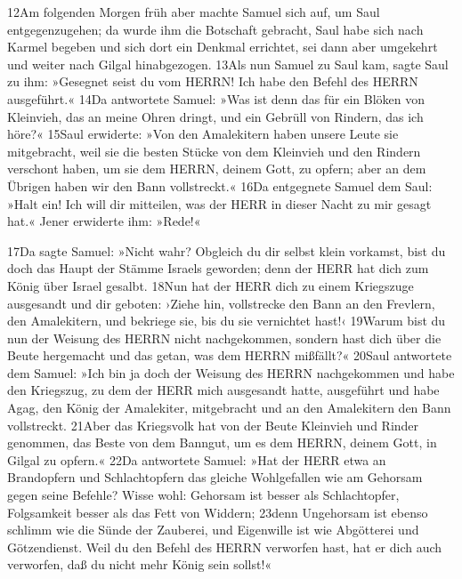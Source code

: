 12Am folgenden Morgen früh aber machte Samuel sich auf, um Saul
entgegenzugehen; da wurde ihm die Botschaft gebracht, Saul habe sich
nach Karmel begeben und sich dort ein Denkmal errichtet, sei dann aber
umgekehrt und weiter nach Gilgal hinabgezogen. 13Als nun Samuel zu Saul
kam, sagte Saul zu ihm: »Gesegnet seist du vom HERRN! Ich habe den
Befehl des HERRN ausgeführt.« 14Da antwortete Samuel: »Was ist denn das
für ein Blöken von Kleinvieh, das an meine Ohren dringt, und ein Gebrüll
von Rindern, das ich höre?« 15Saul erwiderte: »Von den Amalekitern haben
unsere Leute sie mitgebracht, weil sie die besten Stücke von dem
Kleinvieh und den Rindern verschont haben, um sie dem HERRN, deinem
Gott, zu opfern; aber an dem Übrigen haben wir den Bann vollstreckt.«
16Da entgegnete Samuel dem Saul: »Halt ein! Ich will dir mitteilen, was
der HERR in dieser Nacht zu mir gesagt hat.« Jener erwiderte ihm:
»Rede!«

17Da sagte Samuel: »Nicht wahr? Obgleich du dir selbst klein vorkamst,
bist du doch das Haupt der Stämme Israels geworden; denn der HERR hat
dich zum König über Israel gesalbt. 18Nun hat der HERR dich zu einem
Kriegszuge ausgesandt und dir geboten: ›Ziehe hin, vollstrecke den Bann
an den Frevlern, den Amalekitern, und bekriege sie, bis du sie
vernichtet hast!‹ 19Warum bist du nun der Weisung des HERRN nicht
nachgekommen, sondern hast dich über die Beute hergemacht und das getan,
was dem HERRN mißfällt?« 20Saul antwortete dem Samuel: »Ich bin ja doch
der Weisung des HERRN nachgekommen und habe den Kriegszug, zu dem der
HERR mich ausgesandt hatte, ausgeführt und habe Agag, den König der
Amalekiter, mitgebracht und an den Amalekitern den Bann vollstreckt.
21Aber das Kriegsvolk hat von der Beute Kleinvieh und Rinder genommen,
das Beste von dem Banngut, um es dem HERRN, deinem Gott, in Gilgal zu
opfern.« 22Da antwortete Samuel: »Hat der HERR etwa an Brandopfern und
Schlachtopfern das gleiche Wohlgefallen wie am Gehorsam gegen seine
Befehle? Wisse wohl: Gehorsam ist besser als Schlachtopfer, Folgsamkeit
besser als das Fett von Widdern; 23denn Ungehorsam ist ebenso schlimm
wie die Sünde der Zauberei, und Eigenwille ist wie Abgötterei und
Götzendienst. Weil du den Befehl des HERRN verworfen hast, hat er dich
auch verworfen, daß du nicht mehr König sein sollst!«

